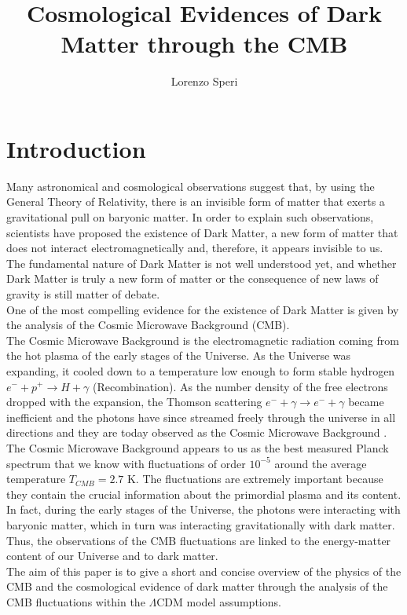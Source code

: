 \documentclass{article}
\title{Cosmological Evidences of Dark Matter through the CMB}
\author{Lorenzo Speri}
\date{}
\begin{document}
\maketitle

\vspace{3cm}
\section{Introduction}
Many astronomical and cosmological observations suggest that, by using the General Theory of Relativity, there is an invisible form of matter that exerts a gravitational pull on baryonic matter. 
In order to explain such observations, scientists have proposed the existence of Dark Matter, a new form of matter that does not interact electromagnetically and, therefore, it appears invisible to us. 
The fundamental nature of Dark Matter is not well understood yet, and whether Dark Matter is truly a new form of matter or the consequence of new laws of gravity is still matter of debate.\\
One of the most compelling evidence for the existence of Dark Matter is given by the analysis of the Cosmic Microwave Background (CMB).\\
The Cosmic Microwave Background is the electromagnetic radiation coming from the hot plasma of the early stages of the Universe.
As the Universe was expanding, it cooled down to a temperature low enough to form stable hydrogen $e^- + p^+  \rightarrow H + \gamma$ (Recombination). 
As the number density of the free electrons dropped with the expansion, the Thomson scattering $e^- + \gamma  \rightarrow e^- + \gamma$ became inefficient and the photons have since streamed freely through the universe in all directions and they are today observed as the Cosmic Microwave Background \citep{LecturesPdf}.\\
The Cosmic Microwave Background appears to us as the best measured Planck spectrum that we know with fluctuations of order $10 ^{-5}$ around the average temperature $T_{CMB} =2.7$ K.
The fluctuations are extremely important because they contain the crucial information about the primordial plasma and its content. 
In fact, during the early stages of the Universe, the photons were interacting with baryonic matter, which in turn was interacting gravitationally with dark matter.
Thus, the observations of the CMB fluctuations are linked to the energy-matter content of our Universe and to dark matter.\\
The aim of this paper is to give a short and concise overview of the physics of the CMB and the cosmological evidence of dark matter through the analysis of the CMB fluctuations within the $\Lambda$CDM model assumptions.\\
\end{document}
